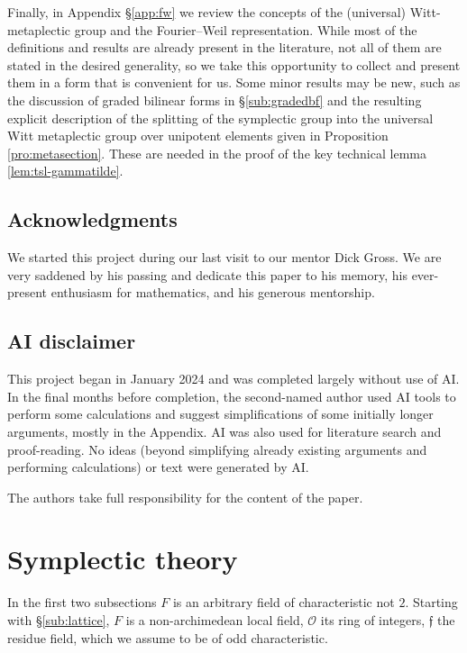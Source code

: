 \documentclass{article}
\def\cO{\mathcal{O}}
\theoremstyle{definition}
\numberwithin{equation}{subsection}
\renewcommand{\-}{\hyp{}}
\newcommand{\rf}{\mathfrak{f}}
\begin{document}
Finally, in Appendix \S\ref{app:fw} we review the concepts of the (universal) Witt-metaplectic group and the Fourier--Weil representation. While most of the definitions and results are already present in the literature, not all of them are stated in the desired generality, so we take this opportunity to collect and present them in a form that is convenient for us. Some minor results may be new, such as the discussion of graded bilinear forms in \S\ref{sub:gradedbf} and the resulting explicit description of the splitting of the symplectic group into the universal Witt metaplectic group over unipotent elements given in Proposition \ref{pro:metasection}. These are needed in the proof of the key technical lemma \ref{lem:tsl-gammatilde}.

\subsection{Acknowledgments}

We started this project during our last visit to our mentor Dick Gross. We are very saddened by his passing and dedicate this paper to his memory, his ever-present enthusiasm for mathematics, and his generous mentorship.




\subsection{AI disclaimer}

This project began in January 2024 and was completed largely without use of AI. In the final months before completion, the second-named author used AI tools to perform some calculations and suggest simplifications of some initially longer arguments, mostly in the Appendix. AI was also used for literature search and proof-reading. No ideas (beyond simplifying already existing arguments and performing calculations) or text were generated by AI. 


The authors take full responsibility for the content of the paper.



\section{Symplectic theory} \label{sec:symp}

In the first two subsections $F$ is an arbitrary field of  characteristic not $2$. Starting with \S\ref{sub:lattice}, $F$ is a  non-archimedean local field, $\cO$ its ring of integers, $\rf$ the residue field, which we assume to be of odd characteristic.
\end{document}
